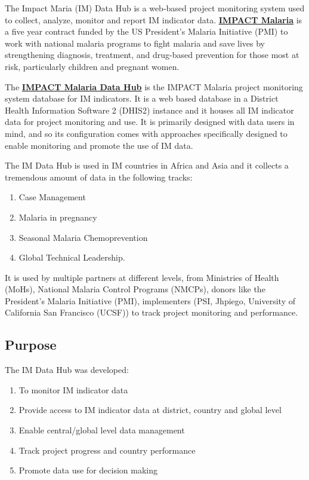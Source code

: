 \documentclass[]{book}
\providecommand{\tightlist}{%
  \setlength{\itemsep}{0pt}\setlength{\parskip}{0pt}}
\begin{document}
The Impact Maria (IM) Data Hub is a web-based project monitoring system used to collect, analyze, monitor and report IM indicator data. \href{https://imdpactmalaria.org}{\textbf{IMPACT Malaria}} is a five year contract funded by the US President's Malaria Initiative (PMI) to work with national malaria programs to fight malaria and save lives by strengthening diagnosis, treatment, and drug-based prevention for those most at risk, particularly children and pregnant women.

The \href{https://imdatahub.org}{\textbf{IMPACT Malaria Data Hub}} is the IMPACT Malaria project monitoring system database for IM indicators. It is a web based database in a District Health Information Software 2 (DHIS2) instance and it houses all IM indicator data for project monitoring and use. It is primarily designed with data users in mind, and so its configuration comes with approaches specifically designed to enable monitoring and promote the use of IM data.

The IM Data Hub is used in IM countries in Africa and Asia and it collects a tremendous amount of data in the following tracks:

\begin{enumerate}
\def\labelenumi{\arabic{enumi}.}
\tightlist
\item
  Case Management
\item
  Malaria in pregnancy
\item
  Seasonal Malaria Chemoprevention
\item
  Global Technical Leadership.
\end{enumerate}

It is used by multiple partners at different levels, from Ministries of Health (MoHs), National Malaria Control Programs (NMCPs), donors like the President's Malaria Initiative (PMI), implementers (PSI, Jhpiego, University of California San Francisco (UCSF)) to track project monitoring and performance.

\hypertarget{purpose}{%
\subsection{Purpose}\label{purpose}}

The IM Data Hub was developed:

\begin{enumerate}
\def\labelenumi{\arabic{enumi}.}
\tightlist
\item
  To monitor IM indicator data
\item
  Provide access to IM indicator data at district, country and global level
\item
  Enable central/global level data management
\item
  Track project progress and country performance
\item
  Promote data use for decision making
\end{enumerate}
\end{document}
